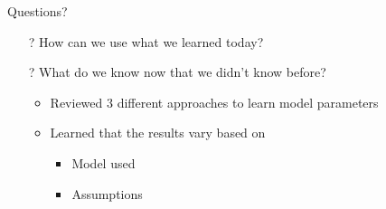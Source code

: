 \documentclass[aspectratio=169]{beamer}
\begin{document}
\begin{frame}{Questions?}
\begin{itemize}
	\item[?] How can we use what we learned today?
	\vspace{2em}
	\item[?] What do we know now that we didn't know before?
\begin{itemize}
\item Reviewed 3 different approaches to learn model parameters
\item Learned that the results vary based on 
\begin{itemize}
\item Model used
\item Assumptions
\end{itemize}
\end{itemize}
\end{itemize}
\end{frame}
\end{document}
